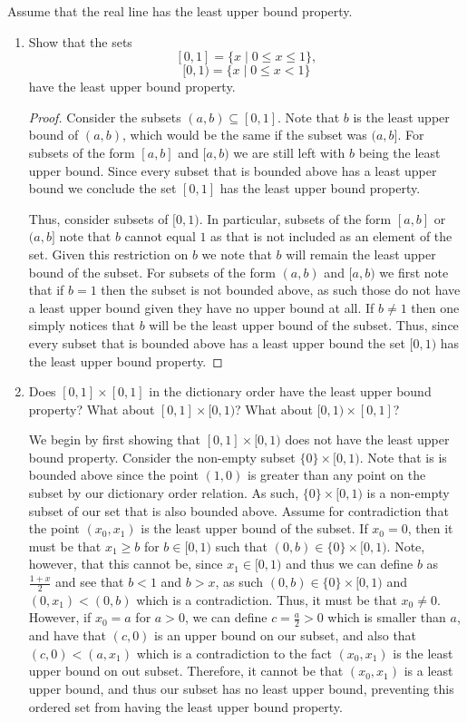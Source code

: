 \documentclass[12pt]{article}
\begin{document}
 Assume that the real line has the least upper bound property.
\begin{enumerate}[label=(\alph*)]
	\item Show that the sets
	$$
	[0, 1] = \{x \mid 0 \leq x \leq 1\},
	$$
	$$
	[0, 1) = \{x \mid 0 \leq x < 1\}
	$$
	have the least upper bound property. 
	\begin{proof}
		Consider the subsets $(a, b) \subseteq [0,1]$. Note that $b$ is the least upper bound
		of $(a, b)$, which would be the same if the subset was $(a,b]$. For subsets of the 
		form $[a, b]$ and $[a, b)$ we are still left with $b$ being the least upper bound.
		Since every subset that is bounded above has a least upper bound we conclude the set 
		$[0, 1]$ has the least upper bound property. 
		
		Thus, consider subsets of $[0, 1)$. In particular, subsets of the form $[a, b]$ or
		$(a, b]$ note 
		that $b$ cannot equal $1$ as that is not included as an element of the set. Given this 
		restriction on $b$ we note that $b$ will remain the least upper bound of the subset. 
		For subsets of the form $(a, b)$ and $[a, b)$ we first note that if $b = 1$ then the 
		subset is not bounded above, as such those do not have a least upper bound given they have
		no upper bound at all. If $b \neq 1$ then one simply notices that $b$ will be the least 
		upper bound of the subset. Thus, since every subset that is bounded above has a least
		upper bound the set $[0, 1)$ has the least upper bound property. 
 	\end{proof}
	\item Does $[0,1] \times [0, 1]$ in the dictionary order have the least upper
	bound property? What about $[0,1] \times [0,1)$?
	What about $[0,1) \times [0, 1]$?
	
	We begin by first showing that $[0, 1] \times [0, 1)$ does not have the least upper bound
	property. Consider the non-empty subset $\{0\} \times [0, 1)$. Note that is is bounded above
	since the point $(1, 0)$ is greater than any point on the subset by our dictionary order relation.
	As such, $\{0\} \times [0, 1)$ is a non-empty subset of our set that is also bounded above. Assume for 
	contradiction that the point $(x_0, x_1)$ is the least upper bound of the subset. If $x_0 = 0$, then
	it must be that $x_1 \geq b$ for $b \in [0, 1)$ such that $(0, b) \in \{0\} \times [0, 1)$. Note, however,
	that this cannot be, since $x_1 \in [0, 1)$ and thus we can define $b$ as $\frac{1 + x}{2}$ and see that
	$b < 1$ and $b > x$, as such $(0, b) \in \{0\} \times [0, 1)$ and $(0, x_1) < (0, b)$ which is a contradiction.
	Thus, it must be that $x_0 \neq 0$. However, if $x_0 = a$ for $a > 0$, we can define $c = \frac{a}{2} > 0$
	which is smaller than $a$, and have that $(c, 0)$ is an upper bound on our subset, and also that 
	$(c, 0) < (a, x_1)$ which is a contradiction to the fact $(x_0, x_1)$ is the least upper bound 
	on out subset. Therefore, it cannot be that $(x_0, x_1)$ is a least upper bound, and thus
	our subset has no least upper bound, preventing this ordered set from having the least upper bound
	property. 
	

\end{enumerate}
\end{document}
